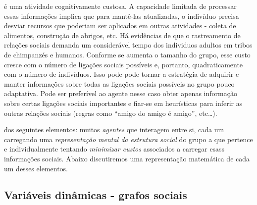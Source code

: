  é uma atividade cognitivamente custosa. A capacidade limitada de processar essas informações implica que para mantê-las atualizadas, o indivíduo precisa desviar recursos 
que poderiam ser aplicados em outras atividades - coleta de alimentos, construção de abrigos, etc. Há evidências \cite[-5em]{deWaal2007,deWaal1990} \sourcesneeded de que o rastreamento de relações sociais demanda um considerável tempo dos individuos adultos em tribos de chimpanzés e humanos. Conforme se aumenta o tamanho do grupo, esse custo cresce com o número de ligações sociais possíveis e, portanto, quadraticamente com o número de indivíduos. Isso pode pode tornar a estratégia de adquirir e manter informações sobre todas as ligações sociais possíveis no grupo pouco adaptativa. Pode ser preferível ao agente nesse caso obter apenas informação sobre certas ligações sociais importantes e fiar-se em heurísticas para inferir as outras relações sociais (regras como ``amigo do amigo é amigo'', etc\ldots{}).

 dos seguintes elementos: muitos \emph{agentes} que interagem entre si, cada um carregando uma \emph{representação mental da estrutura social} do grupo a que pertence e individualmente tentando \emph{minimizar custos} associados a carregar esass informações sociais. Abaixo discutiremos uma representação matemática de cada um desses elementos. 

\subsection{Variáveis dinâmicas - grafos sociais}

